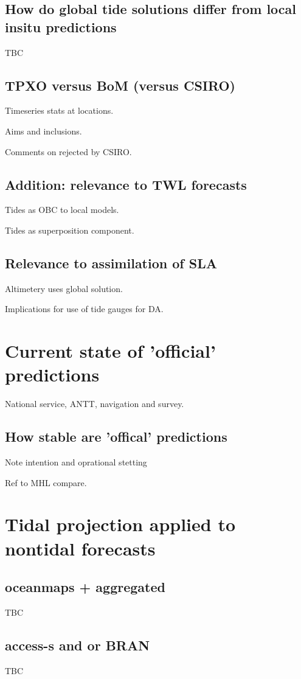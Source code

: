 \subsection{How do global tide solutions differ from local insitu predictions}
TBC

\subsection{TPXO versus BoM (versus CSIRO)}
Timeseries stats at locations.

Aims and inclusions.

Comments on rejected by CSIRO.

\subsection{Addition: relevance to TWL forecasts}
Tides as OBC to local models.

Tides as superposition component.

\subsection{Relevance to assimilation of SLA}
Altimetery uses global solution.

Implications for use of tide gauges for DA.


\section{Current state of 'official' predictions}

National service, ANTT, navigation and survey.

\subsection{How stable are 'offical' predictions}

Note intention and oprational stetting

Ref to MHL compare.


\section{Tidal projection applied to nontidal forecasts}
\subsection{oceanmaps + aggregated}
TBC

\subsection{access-s and or BRAN}
TBC






